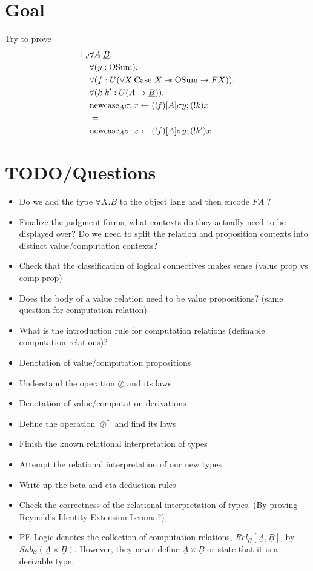 \documentclass{article}
\begin{document}
\section{Goal}
Try to prove 
\begin{align*}
    \vdash_d & \forall A \;\underline{B}. \\
    & \forall (y : \textrm{OSum}). \\
    & \forall (f : U(\forall X . \textrm{Case }X \mathrel{-\mkern-6mu*} \textrm{OSum} \rightarrow F X)). \\
    & \forall (k \; k' : U(A \rightarrow \underline{B})). \\
    & \textrm{newcase}_A \sigma ; x \leftarrow (!f)[A]\sigma y ; (!k) x  \\
    & = \\
    & \textrm{newcase}_A \sigma ; x \leftarrow (!f)[A]\sigma y ; (!k') x  
\end{align*}   

\section{TODO/Questions}
\begin{itemize}
    \item Do we add the type $\forall \underline{X}. \underline{B}$ to the object lang and then encode $F A$ ?
    \item Finalize the judgment forms, what contexts do they actually need to be displayed over? Do we need to split the relation and proposition contexts into distinct value/computation contexts?
    \item Check that the classification of logical connectives makes sense (value prop vs comp prop)
    \item Does the body of a value relation need to be value propositions? (same question for computation relation)
    \item What is the introduction rule for computation relations (definable computation relations)?
    \item Denotation of value/computation propositions
    \item Understand the operation $\oslash$ and its laws
    \item Denotation of value/computation derivations 
    \item Define the operation $\oslash^*$ and find its laws
    \item Finish the known relational interpretation of types
    \item Attempt the relational interpretation of our new types
    \item Write up the beta and eta deduction rules 
    \item Check the correctness of the relational interpretation of types. (By proving Reynold's Identity Extension Lemma?)
    \item PE Logic denotes the collection of computation relations, $Rel_{\mathcal{C}}[\underline{A},\underline{B}]$, by $Sub_{\mathcal{C}}(\underline{A} \times \underline{B})$. However,
          they never define $\underline{A} \times \underline{B}$ or state that it is a derivable type.
\end{itemize}
\end{document}
